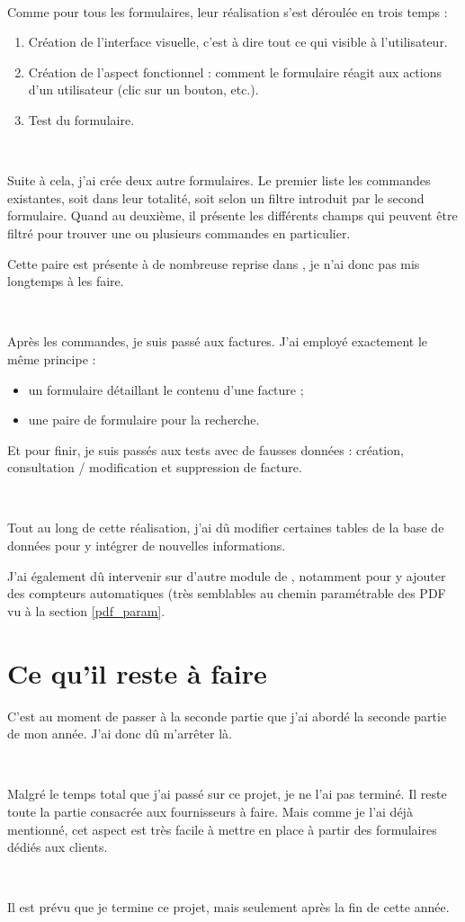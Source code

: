 ~

Comme pour tous les formulaires, leur réalisation s'est déroulée en trois temps :
\begin{enumerate}
	\item Création de l'interface visuelle, c'est à dire tout ce qui visible à l'utilisateur.
	\item Création de l'aspect fonctionnel : comment le formulaire réagit aux actions d'un utilisateur (clic sur un bouton, etc.).
	\item Test du formulaire.
\end{enumerate}

~

Suite à cela, j'ai crée deux autre formulaires. Le premier liste les commandes existantes, soit dans leur totalité, soit selon un filtre introduit par le second formulaire. Quand au deuxième, il présente les différents champs qui peuvent être filtré pour trouver une ou plusieurs commandes en particulier.

Cette paire est présente à de nombreuse reprise dans \integrale, je n'ai donc pas mis longtemps à les faire.

~

Après les commandes, je suis passé aux factures. J'ai employé exactement le même principe :
\begin{itemize}
	\item un formulaire détaillant le contenu d'une facture ;
	\item une paire de formulaire pour la recherche.
\end{itemize}

Et pour finir, je suis passés aux tests avec de fausses données : création, consultation / modification et suppression de facture.

~

Tout au long de cette réalisation, j'ai dû modifier certaines tables de la base de données pour y intégrer de nouvelles informations.

J'ai également dû intervenir sur d'autre module de \integrale, notamment pour y ajouter des compteurs automatiques (très semblables au chemin paramétrable des PDF vu à la section \ref{pdf_param}.

\section{Ce qu'il reste à faire}
C'est au moment de passer à la seconde partie que j'ai abordé la seconde partie de mon année. J'ai donc dû m'arrêter là.

~

Malgré le temps total que j'ai passé sur ce projet, je ne l'ai pas terminé. Il reste toute la partie consacrée aux fournisseurs à faire. Mais comme je l'ai déjà mentionné, cet aspect est très facile à mettre en place à partir des formulaires dédiés aux clients.

~

Il est prévu que je termine ce projet, mais seulement après la fin de cette année.